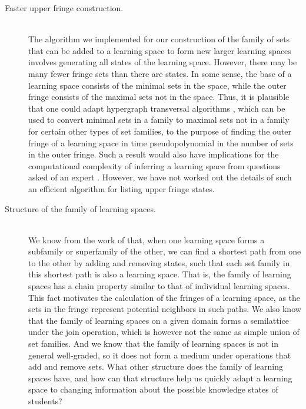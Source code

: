 \documentclass[11pt]{llncs}
\begin{document}
{\begin{description}
\item[Faster upper fringe construction.] \hfill\\
The algorithm we implemented for our construction of the family of sets that can be added to a learning space to form new larger learning spaces involves generating all states of the learning space. However, there may be many fewer fringe sets than there are states.  In some sense, the base of a learning space consists of the minimal sets in the space, while the outer fringe consists of the maximal sets not in the space.  Thus, it is plausible that one could adapt hypergraph transversal algorithms \citep{FreKha-Algs-96}, which can be used to convert minimal sets in a family to maximal sets not in a family for certain other types of set families, to the purpose of finding the outer fringe of a learning space in time pseudopolynomial in the number of sets in the outer fringe. Such a result would also have implications for the computational complexity of inferring a learning space from questions asked of an expert \citep{dowling:93a}. However, we have not worked out the details of such an efficient  algorithm for listing upper fringe states.

\item[Structure of the family of learning spaces.] \hfill\\
We know from the work of \citet{Thi-01} that, when one learning space forms a subfamily or superfamily of the other, we can find a shortest path from one to the other by adding and removing states, such that each set family in this shortest path is also a learning space. That is, the family of learning spaces has a chain property similar to that of individual learning spaces. This fact motivates the calculation of the fringes of a learning space, as the sets in
the fringe represent potential neighbors in such paths. We also know that the family of learning spaces on a given domain forms a semilattice under the join operation, which is however not the same as simple union of set families. And we know that the family of learning spaces is not in general well-graded, so it does not form a medium under operations that add and remove sets. What other structure does the family of learning spaces have, and how can that structure help us quickly adapt a learning space to changing information about the possible knowledge states of students?


\end{description}}
\end{document}
